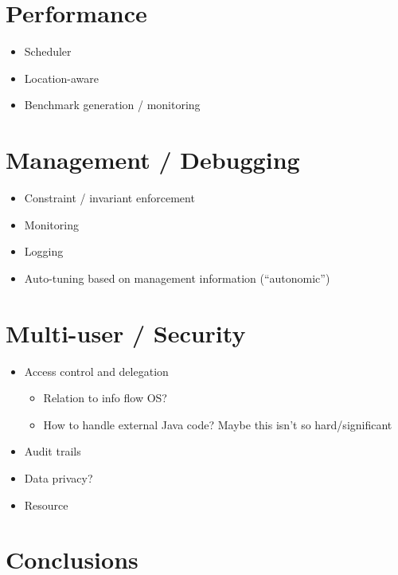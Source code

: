 \documentclass{sig-alternate}
\begin{document}
\section{Performance}
\begin{itemize}
\item
  Scheduler
\item
  Location-aware
\item
  Benchmark generation / monitoring
\end{itemize}

\section{Management / Debugging}
\begin{itemize}
\item
  Constraint / invariant enforcement
\item
  Monitoring
\item
  Logging
\item
  Auto-tuning based on management information (``autonomic'')
\end{itemize}

\section{Multi-user / Security}
\begin{itemize}
\item
  Access control and delegation
  \begin{itemize}
  \item
    Relation to info flow OS?
  \item
    How to handle external Java code? Maybe this isn't so hard/significant
  \end{itemize}
\item
  Audit trails
\item
  Data privacy?
\item
  Resource
\end{itemize}
\section{Conclusions}



\end{document}

